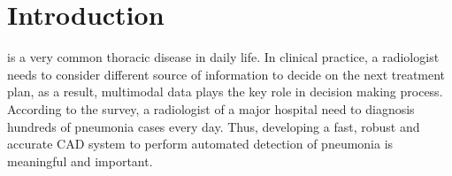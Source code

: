 \documentclass[journal]{IEEEtran}
\begin{document}
%
\IEEEpeerreviewmaketitle


\section{Introduction}
\label{intro}
% 
% 
% 
% 
 is a very common thoracic disease in daily life. In clinical practice, a radiologist needs to consider different source of information to decide on the next treatment plan, as a result, multimodal data plays the key role in decision making process. According to the survey, a radiologist of a major hospital need to diagnosis hundreds of pneumonia cases every day. Thus, developing a fast, robust and accurate CAD system to perform automated detection of pneumonia is meaningful and important. 
\end{document}
